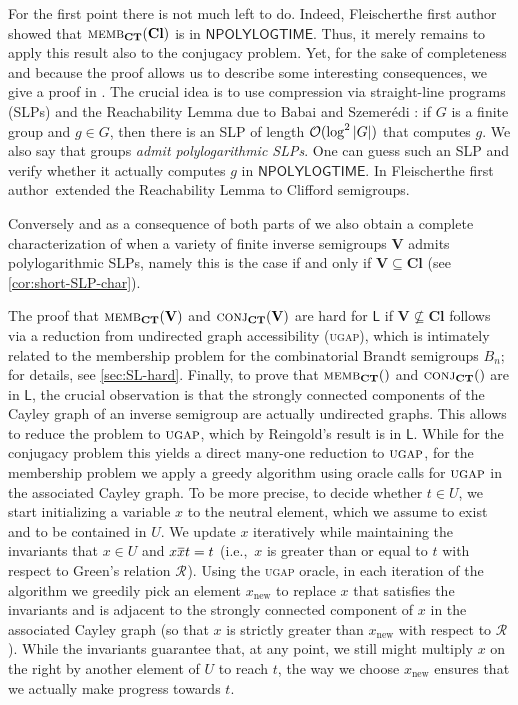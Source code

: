 \documentclass[anonymous,letter,UKenglish,cleveref,autoref,thm-restate]{lipics-v2021}
\newcommand{\ie}{i.e.,~}
\newcommand{\sse}{\subseteq}
\newcommand{\abs}[1] {\ensuremath\left|#1\right|}
\newcommand{\bigO}{\mathcal{O}}
\newcommand{\NPOLYLOGTIME}{\ensuremath{\mathsf{NPOLYLOGTIME}}\xspace}
\newcommand{\LOGSPACE}{\ensuremath{\mathsf{L}}\xspace}
\newcommand{\vV}{\ensuremath{\mathbf{V}}}
\newcommand{\vCl}{\ensuremath{\mathbf{Cl}}}
\newcommand*{\gR}[1][]{\mathrel{\mathcal{R}_{#1}}}
\newcommand\nindent{.5pt}
\newcommand\noverline[1]{\kern\nindent\overline{\kern-\nindent#1\kern-\nindent}\kern\nindent}
\newcommand{\ov}[1]{\noverline{#1}}
\theoremstyle{plain}
\theoremstyle{plain}
\newcommand{\dMemb}[2][]{\textup{\textsc{memb${}_{\mathbf{#1}}\expandafter\ifx\expandafter\relax\detokenize{#2}\relax\else(#2)\fi$}}}
\newcommand{\dConj}[2][]{\textup{\textsc{conj${}_{\mathbf{#1}}\expandafter\ifx\expandafter\relax\detokenize{#2}\relax\else(#2)\fi$}}}
\newcommand{\prob}[1]{\textup{\textsc{#1}}\xspace}
\newcommand{\dUGAP}{\prob{ugap}}
\begin{document}
For the first point there is not much left to do.
Indeed, \ifAnonimous Fleischer\else the first author\fi~\cite{Fleischer19diss,Fleischer22} showed that $\dMemb[CT]{\vCl}$ is in \NPOLYLOGTIME.
Thus, it merely remains to apply this result also to the conjugacy problem.
Yet, for the sake of completeness and because the proof allows us to describe some interesting consequences, we give a proof in .
The crucial idea is to use compression via straight-line programs (SLPs) and the Reachability Lemma due to Babai and Szemer\'edi \cite{BabaiS84}:
if $G$ is a finite group and $g \in G$, then there is an SLP of length $\bigO(\log^2 \abs{G})$ that computes $g$.
We also say that groups \emph{admit polylogarithmic SLPs}.
One can guess such an SLP and verify whether it actually computes $g$ in \NPOLYLOGTIME.
In \cite{Fleischer19diss,Fleischer22} \ifAnonimous Fleischer\else the first author\fi\ extended the Reachability Lemma to Clifford semigroups.

Conversely and as a consequence of both parts of  we also obtain a complete characterization of when a variety of finite inverse semigroups  $\vV$ admits polylogarithmic SLPs, namely this is the case if and only if $\vV \sse \vCl$ (see \cref{cor:short-SLP-char}).

The proof that $\dMemb[CT]{\vV}$ and $\dConj[CT]{\vV}$ are hard for \LOGSPACE if $\vV \not\sse \vCl$ follows via a reduction from undirected graph accessibility (\dUGAP), which is intimately related to the membership problem for the combinatorial Brandt semigroups $B_n$; for details, see \cref{sec:SL-hard}.
Finally, to prove that $\dMemb[CT]{}$ and $\dConj[CT]{}$ are in \LOGSPACE, the crucial observation is that the strongly connected components of the Cayley graph of an inverse semigroup are actually undirected graphs. 
This allows to reduce the problem to $\dUGAP$, which by Reingold's result \cite{Reingold08} is in \LOGSPACE.
While for the conjugacy problem this yields a direct many-one reduction to $\dUGAP$, for the membership problem we apply a greedy algorithm using oracle calls for $\dUGAP$ in the associated Cayley graph.
To be more precise, to decide whether $t \in U$, we start initializing a variable $x$ to the neutral element, which we assume to exist and to be contained in $U$.
We update $x$ iteratively while maintaining the invariants that $x \in U$ and $x \ov x t = t$ (\ie $x$ is greater than or equal to $t$ with respect to Green's relation $\gR$). 
Using the \dUGAP oracle, in each iteration of the algorithm we greedily pick an element $x_{\mathrm{new}}$ to replace $x$ that satisfies the invariants and is adjacent to the strongly connected component of $x$ in the associated Cayley graph (so that $x$ is strictly greater than $x_{\mathrm{new}}$ with respect to $\gR$).
While the invariants guarantee that, at any point, we still might multiply $x$ on the right by another element of $U$ to reach $t$, the way we choose  $x_{\mathrm{new}}$ ensures that we actually make progress towards $t$.
\end{document}
